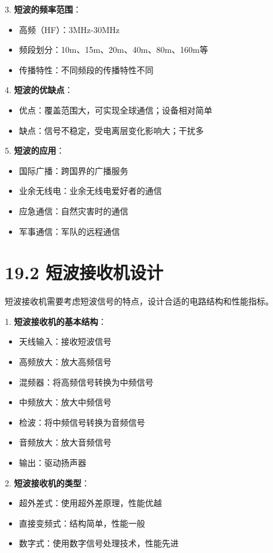 \documentclass[12pt,UTF8]{ctexbook}
\begin{document}
3. \textbf{短波的频率范围}：
   \begin{itemize}[leftmargin=3.5em]
   \item 高频（HF）：3MHz-30MHz
   \item 频段划分：10m、15m、20m、40m、80m、160m等
   \item 传播特性：不同频段的传播特性不同
   \end{itemize}

4. \textbf{短波的优缺点}：
   \begin{itemize}[leftmargin=3.5em]
   \item 优点：覆盖范围大，可实现全球通信；设备相对简单
   \item 缺点：信号不稳定，受电离层变化影响大；干扰多
   \end{itemize}

5. \textbf{短波的应用}：
   \begin{itemize}[leftmargin=3.5em]
   \item 国际广播：跨国界的广播服务
   \item 业余无线电：业余无线电爱好者的通信
   \item 应急通信：自然灾害时的通信
   \item 军事通信：军队的远程通信
   \end{itemize}

\section*{19.2 短波接收机设计}

短波接收机需要考虑短波信号的特点，设计合适的电路结构和性能指标。

1. \textbf{短波接收机的基本结构}：
   \begin{itemize}[leftmargin=3.5em]
   \item 天线输入：接收短波信号
   \item 高频放大：放大高频信号
   \item 混频器：将高频信号转换为中频信号
   \item 中频放大：放大中频信号
   \item 检波：将中频信号转换为音频信号
   \item 音频放大：放大音频信号
   \item 输出：驱动扬声器
   \end{itemize}

2. \textbf{短波接收机的类型}：
   \begin{itemize}[leftmargin=3.5em]
   \item 超外差式：使用超外差原理，性能优越
   \item 直接变频式：结构简单，性能一般
   \item 数字式：使用数字信号处理技术，性能先进
   \end{itemize}
\end{document}
